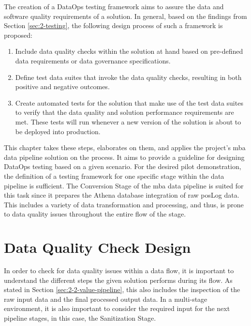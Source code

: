 
The creation of a DataOps testing framework aims to assure the data and software quality requirements of a solution. In general, based on the findings from Section \ref{sec:2-testing}, the following design process of such a framework is proposed:

\begin{enumerate}
	\item Include data quality checks within the solution at hand based on pre-defined data requirements or data governance specifications.
	\item Define test data suites that invoke the data quality checks, resulting in both positive and negative outcomes.
	\item Create automated tests for the solution that make use of the test data suites to verify that the data quality and solution performance requirements are met. These tests will run whenever a new version of the solution is about to be deployed into production.
\end{enumerate}

This chapter takes these steps, elaborates on them, and applies the project's \ac{mba} data pipeline solution on the process. It aims to provide a guideline for designing DataOps testing based on a given scenario. For the desired pilot demonstration, the definition of a testing framework for one specific stage within the data pipeline is sufficient. The Conversion Stage of the \ac{mba} data pipeline is suited for this task since it prepares the Athena database integration of raw \ac{pos}Log data. This includes a variety of data transformation and processing, and thus, is prone to data quality issues throughout the entire flow of the stage.

\section{Data Quality Check Design}
In order to check for data quality issues within a data flow, it is important to understand the different steps the given solution performs during its flow. As stated in Section \ref{sec:2-2-value-pipeline}, this also includes the inspection of the raw input data and the final processed output data. In a multi-stage environment, it is also important to consider the required input for the next pipeline stages, in this case, the Sanitization Stage.

